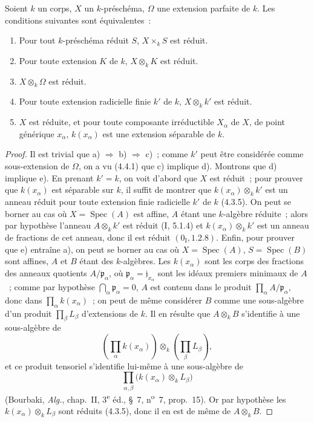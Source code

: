 \begin{proposition}[4.6.1]
\label{IV.2.4.6.1-fr}
Soient $k$ un corps, $X$ un $k$-préschéma, $\Omega$ une extension parfaite de
$k$. Les conditions suivantes sont équivalentes~:
\begin{enumerate}
\item[a)] Pour tout $k$-préschéma réduit $S$, $X\times_k S$ est réduit.
\item[b)] Pour toute extension $K$ de $k$, $X\otimes_k K$ est réduit.
\item[c)] $X\otimes_k\Omega$ est réduit.
\item[d)] Pour toute extension radicielle finie $k'$ de $k$, $X\otimes_k k'$ est
réduit.
\item[e)] $X$ est réduite, et pour toute composante irréductible $X_\alpha$ de
$X$, de point générique $x_\alpha$, $k(x_\alpha)$ est une extension séparable de
$k$.
\end{enumerate}
\end{proposition}

\begin{proof}
Il est trivial que a) $\Rightarrow$ b) $\Rightarrow$ c)~; comme $k'$ peut être
considérée comme sous-extension de $\Omega$, on a vu (4.4.1) que c) implique
d). Montrons que d) implique e). En prenant $k'=k$, on voit d'abord que $X$
est réduit~; pour prouver que $k(x_\alpha)$ est séparable sur $k$, il suffit de
montrer que $k(x_\alpha)\otimes_k k'$ est un anneau réduit pour toute extension
finie radicielle $k'$ de $k$ (4.3.5). On peut se borner au cas où
$X=\operatorname{Spec}(A)$ est affine, $A$ étant une $k$-algèbre réduite~; alors
par hypothèse l'anneau $A\otimes_k k'$ est réduit (I, 5.1.4) et
$k(x_\alpha)\otimes_k k'$ est un anneau de fractions de cet anneau, donc il est
réduit $(0_{\mathrm I},1.2.8)$. Enfin, pour prouver que e) entraîne a), on peut
se borner au cas où $X=\operatorname{Spec}(A)$, $S=\operatorname{Spec}(B)$ sont
affines, $A$ et $B$ étant des $k$-algèbres. Les $k(x_\alpha)$ sont les corps des
fractions des anneaux quotients $A/\mathfrak p_\alpha$, où
$\mathfrak p_\alpha=\mathfrak j_{x_\alpha}$ sont les idéaux premiers minimaux de
$A$~; comme par hypothèse $\bigcap_\alpha\mathfrak p_\alpha=0$, $A$ est contenu
dans le produit $\prod_\alpha A/\mathfrak p_\alpha$, donc dans
$\prod_\alpha k(x_\alpha)$~; on peut de même considérer $B$ comme une
sous-algèbre d'un produit $\prod_\beta L_\beta$ d'extensions de $k$. Il en
résulte que $A\otimes_k B$ s'identifie à une sous-algèbre de
\[
\left(\prod_\alpha k(x_\alpha)\right)\otimes_k
\left(\prod_\beta L_\beta\right),
\]
et ce produit tensoriel s'identifie lui-même à une sous-algèbre de
\[
\prod_{\alpha,\beta}\bigl(k(x_\alpha)\otimes_k L_\beta\bigr)
\]
(Bourbaki, \emph{Alg.}, chap.~II, 3\textsuperscript{e} éd., \S~7,
n\textsuperscript{o}~7, prop.~15). Or par hypothèse les
$k(x_\alpha)\otimes_k L_\beta$ sont réduits (4.3.5), donc il en est de même de
$A\otimes_k B$.
\end{proof}

